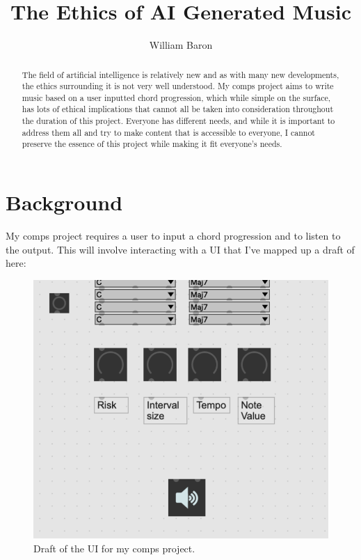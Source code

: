 \documentclass[10pt,twocolumn]{article}
\title{The Ethics of AI Generated Music}
\author{William Baron}
\affiliation{Occidental College}
\begin{document}
\maketitle

\begin{abstract}
    The field of artificial intelligence is relatively new and as with many new developments, the ethics surrounding it is not very well understood. My comps project aims to write music based on a user inputted chord progression, which while simple on the surface, has lots of ethical implications that cannot all be taken into consideration throughout the duration of this project. Everyone has different needs, and while it is important to address them all and try to make content that is accessible to everyone, I cannot preserve the essence of this project while making it fit everyone's needs.
\end{abstract}

\section{Background}
    My comps project requires a user to input a chord progression and to listen to the output. This will involve interacting with a UI that I've mapped up a draft of here:
    
\begin{figure}[h]
    \centering
    \includegraphics[width=.95\linewidth]{uidraft.png}
    \caption{
        Draft of the UI for my comps project.
    }
    \label{fig:first-page}
\end{figure}
\end{document}
